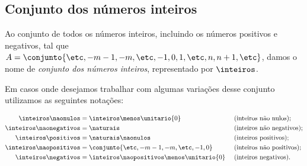 \subsection{Conjunto dos números inteiros}

Ao conjunto de todos os números inteiros, incluindo os números positivos e negativos, tal que $A = \conjunto{\etc , -m -1, -m, \etc, -1, 0, 1,  \etc , n, n+1, \etc}$, damos o nome de \emph{conjunto dos números inteiros}, representado por $\inteiros$. 

Em casos onde desejamos trabalhar com algumas variações desse conjunto utilizamos as seguintes notações:

\begin{align*}
	\inteiros\naonulos     &= \inteiros \menos \unitario{0}              &&\text{ (inteiros não nulos);}     \\
	\inteiros\naonegativos &= \naturais                                  &&\text{ (inteiros não negativos);} \\
	\inteiros\positivos    &= \naturais\naonulos                         &&\text{ (inteiros positivos);}     \\
	\inteiros\naopositivos &= \conjunto{\etc, -{m-1}, -m, \etc, -1, 0}   &&\text{ (inteiros não positivos);} \\
	\inteiros\negativos    &= \inteiros\naopositivos \menos \unitario{0} &&\text{ (inteiros negativos).}     
\end{align*}
